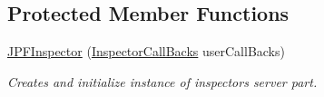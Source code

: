 \subsection*{Protected Member Functions}
\begin{DoxyCompactItemize}
\item 
\hyperlink{classgov_1_1nasa_1_1jpf_1_1inspector_1_1server_1_1jpf_1_1_j_p_f_inspector_a53abd30368848ee271eb798a0ef14992}{J\+P\+F\+Inspector} (\hyperlink{interfacegov_1_1nasa_1_1jpf_1_1inspector_1_1interfaces_1_1_inspector_call_backs}{Inspector\+Call\+Backs} user\+Call\+Backs)
\begin{DoxyCompactList}\small\item\em Creates and initialize instance of inspector\textquotesingle{}s server part. \end{DoxyCompactList}\end{DoxyCompactItemize}

